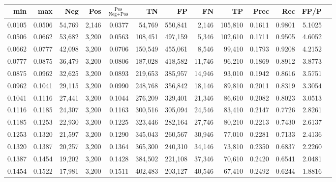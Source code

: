 \begin{tabular}{rrrrrrrrrrrrr}
\toprule
   min &    max &    Neg &   Pos & $\frac{\text{Pos}}{\text{Neg}+\text{Pos}}$ &      TN &      FP &      FN &      TP &   Prec &    Rec &   FP/P \\
\midrule
0.0105 & 0.0506 & 54,769 & 2,146 &                                     0.0377 &  54,769 & 550,841 &   2,146 & 105,810 & 0.1611 & 0.9801 & 5.1025 \\
0.0506 & 0.0662 & 53,682 & 3,200 &                                     0.0563 & 108,451 & 497,159 &   5,346 & 102,610 & 0.1711 & 0.9505 & 4.6052 \\
0.0662 & 0.0777 & 42,098 & 3,200 &                                     0.0706 & 150,549 & 455,061 &   8,546 &  99,410 & 0.1793 & 0.9208 & 4.2152 \\
0.0777 & 0.0875 & 36,479 & 3,200 &                                     0.0806 & 187,028 & 418,582 &  11,746 &  96,210 & 0.1869 & 0.8912 & 3.8773 \\
0.0875 & 0.0962 & 32,625 & 3,200 &                                     0.0893 & 219,653 & 385,957 &  14,946 &  93,010 & 0.1942 & 0.8616 & 3.5751 \\
0.0962 & 0.1041 & 29,115 & 3,200 &                                     0.0990 & 248,768 & 356,842 &  18,146 &  89,810 & 0.2011 & 0.8319 & 3.3054 \\
0.1041 & 0.1116 & 27,441 & 3,200 &                                     0.1044 & 276,209 & 329,401 &  21,346 &  86,610 & 0.2082 & 0.8023 & 3.0513 \\
0.1116 & 0.1185 & 24,307 & 3,200 &                                     0.1163 & 300,516 & 305,094 &  24,546 &  83,410 & 0.2147 & 0.7726 & 2.8261 \\
0.1185 & 0.1253 & 22,930 & 3,200 &                                     0.1225 & 323,446 & 282,164 &  27,746 &  80,210 & 0.2213 & 0.7430 & 2.6137 \\
0.1253 & 0.1320 & 21,597 & 3,200 &                                     0.1290 & 345,043 & 260,567 &  30,946 &  77,010 & 0.2281 & 0.7133 & 2.4136 \\
0.1320 & 0.1387 & 20,257 & 3,200 &                                     0.1364 & 365,300 & 240,310 &  34,146 &  73,810 & 0.2350 & 0.6837 & 2.2260 \\
0.1387 & 0.1454 & 19,202 & 3,200 &                                     0.1428 & 384,502 & 221,108 &  37,346 &  70,610 & 0.2420 & 0.6541 & 2.0481 \\
0.1454 & 0.1522 & 17,981 & 3,200 &                                     0.1511 & 402,483 & 203,127 &  40,546 &  67,410 & 0.2492 & 0.6244 & 1.8816 \\

\end{tabular}
